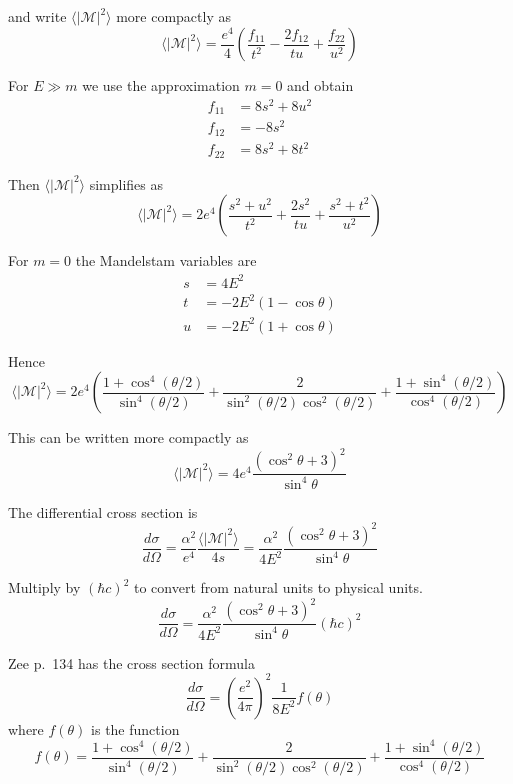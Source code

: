 and write $\langle|\mathcal{M}|^2\rangle$ more compactly as
\begin{equation*}
\langle|\mathcal{M}|^2\rangle
=\frac{e^4}{4}
\left(\frac{f_{11}}{t^2}-\frac{2f_{12}}{tu}+\frac{f_{22}}{u^2}\right)
\end{equation*}

For $E\gg m$ we use the approximation $m=0$ and obtain
\begin{align*}
f_{11}&=8s^2+8u^2\\
f_{12}&=-8s^2\\
f_{22}&=8s^2+8t^2
\end{align*}

Then $\langle|\mathcal{M}|^2\rangle$ simplifies as
\begin{equation*}
\langle|\mathcal{M}|^2\rangle
=2e^4\left(\frac{s^2+u^2}{t^2}+\frac{2s^2}{tu}+\frac{s^2+t^2}{u^2}\right)
\end{equation*}

For $m=0$ the Mandelstam variables are
\begin{align*}
s&=4E^2
\\
t&=-2E^2(1-\cos\theta)
\\
u&=-2E^2(1+\cos\theta)
\end{align*}

Hence
\begin{equation*}
\langle|\mathcal{M}|^2\rangle
=2e^4\left(
\frac{1+\cos^4(\theta/2)}{\sin^4(\theta/2)}
+\frac{2}{\sin^2(\theta/2)\cos^2(\theta/2)}
+\frac{1+\sin^4(\theta/2)}{\cos^4(\theta/2)}
\right)
\end{equation*}

This can be written more compactly as
\begin{equation*}
\langle|\mathcal{M}|^2\rangle=4e^4\frac{(\cos^2\theta+3)^2}{\sin^4\theta}
\end{equation*}

The differential cross section is
\begin{equation*}
\frac{d\sigma}{d\Omega}=\frac{\alpha^2}{e^4}\frac{\langle|\mathcal{M}|^2\rangle}{4s}
=\frac{\alpha^2}{4E^2}\frac{(\cos^2\theta+3)^2}{\sin^4\theta}
\end{equation*}

Multiply by $(\hbar c)^2$ to convert from natural units to physical units.
\begin{equation*}
\frac{d\sigma}{d\Omega}=\frac{\alpha^2}{4E^2}
\frac{(\cos^2\theta+3)^2}{\sin^4\theta}(\hbar c)^2
\end{equation*}

Zee p.~134 has the cross section formula
\begin{equation*}
\frac{d\sigma}{d\Omega}=\left(\frac{e^2}{4\pi}\right)^2\frac{1}{8E^2}f(\theta)
\end{equation*}
where $f(\theta)$ is the function
\begin{equation*}
f(\theta)=
\frac{1+\cos^4(\theta/2)}{\sin^4(\theta/2)}
+\frac{2}{\sin^2(\theta/2)\cos^2(\theta/2)}
+\frac{1+\sin^4(\theta/2)}{\cos^4(\theta/2)}
\end{equation*}

